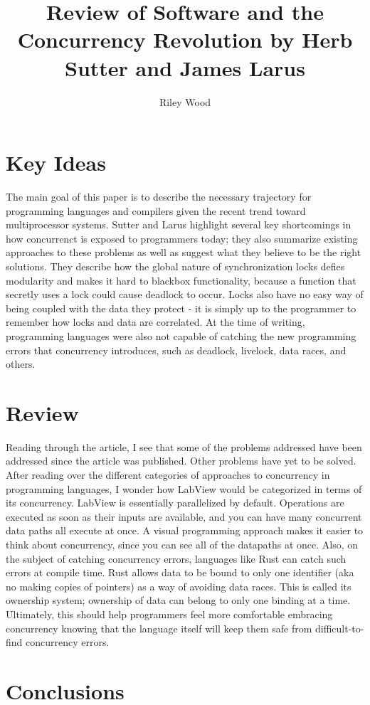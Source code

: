 \documentclass{article}
\title{Review of Software and the Concurrency Revolution by Herb Sutter and James Larus}
\author{Riley Wood}
\begin{document}
\maketitle

\section*{Key Ideas}
The main goal of this paper is to describe the necessary trajectory for programming languages and compilers given the recent trend toward multiprocessor systems. Sutter and Larus highlight several key shortcomings in how concurrenct is exposed to programmers today; they also summarize existing approaches to these problems as well as suggest what they believe to be the right solutions. They describe how the global nature of synchronization locks defies modularity and makes it
hard to blackbox functionality, because a function that secretly uses a lock could cause deadlock to occur. Locks also have no easy way of being coupled with the data they protect - it is simply up to the programmer to remember how locks and data are correlated. At the time of writing, programming languages were also not capable of catching the new programming errors that concurrency introduces, such as deadlock, livelock, data races, and others.

\section*{Review}
Reading through the article, I see that some of the problems addressed have been addressed since the article was published. Other problems have yet to be solved. After reading over the different categories of approaches to concurrency in programming languages, I wonder how LabView would be categorized in terms of its concurrency. LabView is essentially parallelized by default. Operations are executed as soon as their inputs are available, and you can have many concurrent data paths all execute at once. A visual programming approach makes it easier to think about concurrency, since you can see all of the datapaths at once. Also, on the subject of catching
concurrency errors, languages like Rust can catch such errors at compile time. Rust allows data to be bound to only one identifier (aka no making copies of pointers) as a way of avoiding data races. This is called its ownership system; ownership of data can belong to only one binding at a time. Ultimately, this should help programmers feel more comfortable embracing concurrency knowing that the language itself will keep them safe from difficult-to-find concurrency errors.

\section*{Conclusions}


\end{document}
